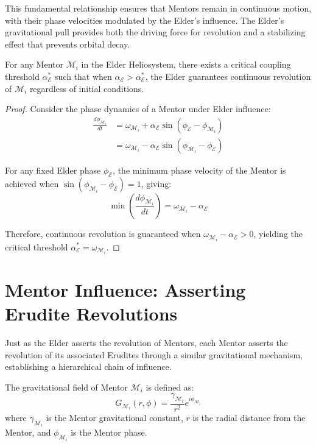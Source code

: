 This fundamental relationship ensures that Mentors remain in continuous motion, with their phase velocities modulated by the Elder's influence. The Elder's gravitational pull provides both the driving force for revolution and a stabilizing effect that prevents orbital decay.

\begin{theorem}
For any Mentor $\mathcal{M}_i$ in the Elder Heliosystem, there exists a critical coupling threshold $\alpha_{\mathcal{E}}^*$ such that when $\alpha_{\mathcal{E}} > \alpha_{\mathcal{E}}^*$, the Elder guarantees continuous revolution of $\mathcal{M}_i$ regardless of initial conditions.
\end{theorem}

\begin{proof}
Consider the phase dynamics of a Mentor under Elder influence:
\begin{align}
\frac{d\phi_{\mathcal{M}_i}}{dt} &= \omega_{\mathcal{M}_i} + \alpha_{\mathcal{E}} \sin(\phi_{\mathcal{E}} - \phi_{\mathcal{M}_i})\\
&= \omega_{\mathcal{M}_i} - \alpha_{\mathcal{E}} \sin(\phi_{\mathcal{M}_i} - \phi_{\mathcal{E}})
\end{align}

For any fixed Elder phase $\phi_{\mathcal{E}}$, the minimum phase velocity of the Mentor is achieved when $\sin(\phi_{\mathcal{M}_i} - \phi_{\mathcal{E}}) = 1$, giving:
\begin{equation}
\min\left(\frac{d\phi_{\mathcal{M}_i}}{dt}\right) = \omega_{\mathcal{M}_i} - \alpha_{\mathcal{E}}
\end{equation}

Therefore, continuous revolution is guaranteed when $\omega_{\mathcal{M}_i} - \alpha_{\mathcal{E}} > 0$, yielding the critical threshold $\alpha_{\mathcal{E}}^* = \omega_{\mathcal{M}_i}$.
\end{proof}

\section{Mentor Influence: Asserting Erudite Revolutions}

Just as the Elder asserts the revolution of Mentors, each Mentor asserts the revolution of its associated Erudites through a similar gravitational mechanism, establishing a hierarchical chain of influence.

\begin{definition}
The gravitational field of Mentor $\mathcal{M}_i$ is defined as:
\begin{equation}
G_{\mathcal{M}_i}(r, \phi) = \frac{\gamma_{\mathcal{M}_i}}{r^2}e^{i\phi_{\mathcal{M}_i}}
\end{equation}
where $\gamma_{\mathcal{M}_i}$ is the Mentor gravitational constant, $r$ is the radial distance from the Mentor, and $\phi_{\mathcal{M}_i}$ is the Mentor phase.
\end{definition}

